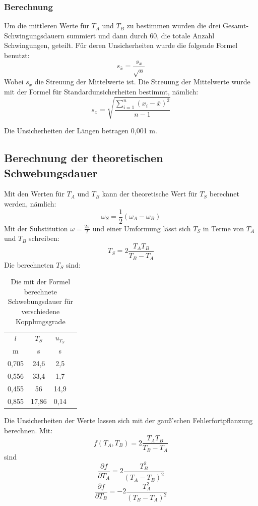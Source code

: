 \documentclass[11pt,a4paper]{article}
\begin{document}
\subsubsection{Berechnung}
Um die mittleren Werte für $T_A$ und $T_B$ zu bestimmen wurden die drei Gesamt-Schwingungsdauern summiert und dann durch 60, die totale Anzahl Schwingungen, geteilt. Für deren Unsicherheiten wurde die folgende Formel benutzt:
$$ s_{\bar{x}} = \frac{s_x}{\sqrt{n}}$$
Wobei $s_x$ die Streuung der Mittelwerte ist. Die Streuung der Mittelwerte wurde mit der Formel für Standardunsicherheiten bestimmt, nämlich:
$$s_x=\sqrt{\frac{\sum_{i=1}^{n}(x_i-\bar{x})^2}{n-1}}$$

Die Unsicherheiten der Längen betragen 0,001 m. 

\subsection{Berechnung der theoretischen Schwebungsdauer}
Mit den Werten für $T_A$ und $T_B$ kann der theoretische Wert für $T_S$ berechnet werden, nämlich:
$$\omega_S = \frac{1}{2}(\omega_A-\omega_B)$$
Mit der Substitution $\omega = \frac{2\pi}{T}$ und einer Umformung lässt sich $T_S$ in Terme von $T_A$ und $T_B$ schreiben:
\begin{equation}
T_S = 2\frac{T_A T_B}{T_B-T_A}
\end{equation}
Die berechneten $T_S$ sind:

\begin{table}[h]
	\centering
	\begin{tabular*}{0.99\textwidth}{@{\extracolsep{\fill}}cccc}
		\toprule
		$l$ & $T_S$ & $u_{T_S}$  \\
		m & s & s   \\
		\bottomrule
		0,705 & 24,6 & 2,5 \\
		0,556 & 33,4 & 1,7 \\
		0,455 & 56 & 14,9 \\
		0,855 & 17,86 & 0,14 \\
		\bottomrule
	\end{tabular*}
	\caption{Die mit der Formel berechnete Schwebungsdauer für verschiedene Kopplungsgrade}
	\label{tabelle}
\end{table}

Die Unsicherheiten der Werte lassen sich mit der gauß'schen Fehlerfortpflanzung berechnen. Mit:
$$f(T_A,T_B) = 2\frac{T_A T_B}{T_B-T_A}$$ 
sind
$$\frac{\partial f}{\partial T_A} = 2\frac{T_B^2}{(T_A-T_B)^2}$$
$$\frac{\partial f}{\partial T_B} = -2\frac{T_A^2}{(T_B-T_A)^2}$$
\end{document}
